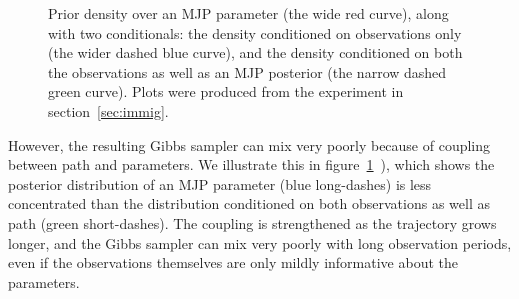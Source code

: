 \begin{figure}
\begin{minipage}[!hp]{0.3\linewidth}
    \vspace{-0 in}
  \end{minipage}
  \vspace{-.3in}
  \caption{Prior density over an MJP parameter (the wide red curve), along with two conditionals: 
    the density conditioned on observations only (the wider dashed blue curve), and the density conditioned on both the observations as well as an MJP posterior (the narrow dashed green curve). 
  Plots were produced from the experiment in section~\ref{sec:immig}.}
     \label{fig:hist}
  \end{figure}
  However, the resulting Gibbs sampler can mix very poorly because of coupling between path and parameters.
  We illustrate this in figure~\ref{fig:hist}~\citep[inspired by][]{papaspiliopoulos2007general}), which shows the posterior distribution of an MJP parameter (blue long-dashes) is less concentrated than the distribution conditioned on both observations as well as path (green short-dashes). 
The coupling is strengthened as the trajectory grows longer, and the Gibbs sampler can mix very poorly with long observation periods, even if the observations themselves are only mildly informative about the parameters.


